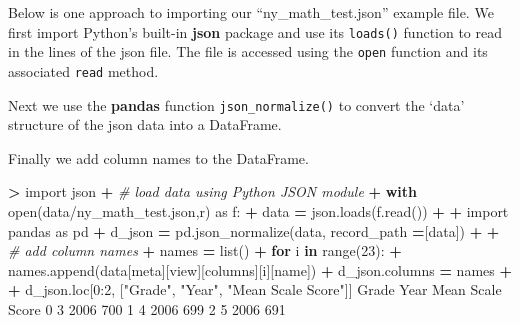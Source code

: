 \documentclass[
]{book}
\newenvironment{Shaded}{\begin{snugshade}}{\end{snugshade}}
\newcommand{\BuiltInTok}[1]{#1}
\newcommand{\CommentTok}[1]{\textcolor[rgb]{0.56,0.35,0.01}{\textit{#1}}}
\newcommand{\ControlFlowTok}[1]{\textcolor[rgb]{0.13,0.29,0.53}{\textbf{#1}}}
\newcommand{\DecValTok}[1]{\textcolor[rgb]{0.00,0.00,0.81}{#1}}
\newcommand{\ImportTok}[1]{#1}
\newcommand{\KeywordTok}[1]{\textcolor[rgb]{0.13,0.29,0.53}{\textbf{#1}}}
\newcommand{\NormalTok}[1]{#1}
\newcommand{\OperatorTok}[1]{\textcolor[rgb]{0.81,0.36,0.00}{\textbf{#1}}}
\newcommand{\StringTok}[1]{\textcolor[rgb]{0.31,0.60,0.02}{#1}}
\begin{document}
Below is one approach to importing our ``ny\_math\_test.json'' example file. We first import Python's built-in \textbf{json} package and use its \texttt{loads()} function to read in the lines of the json file. The file is accessed using the \texttt{open} function and its associated \texttt{read} method.

Next we use the \textbf{pandas} function \texttt{json\_normalize()} to convert the `data' structure of the json data into a DataFrame.

Finally we add column names to the DataFrame.

\begin{Shaded}
\begin{Highlighting}[]
\OperatorTok{\textgreater{}} \ImportTok{import}\NormalTok{ json}
\OperatorTok{+} \CommentTok{\# load data using Python JSON module}
\OperatorTok{+} \ControlFlowTok{with} \BuiltInTok{open}\NormalTok{(}\StringTok{\textquotesingle{}data/ny\_math\_test.json\textquotesingle{}}\NormalTok{,}\StringTok{\textquotesingle{}r\textquotesingle{}}\NormalTok{) }\ImportTok{as}\NormalTok{ f:}
\OperatorTok{+}\NormalTok{     data }\OperatorTok{=}\NormalTok{ json.loads(f.read())}
\OperatorTok{+} 
\OperatorTok{+} \ImportTok{import}\NormalTok{ pandas }\ImportTok{as}\NormalTok{ pd  }
\OperatorTok{+}\NormalTok{ d\_json }\OperatorTok{=}\NormalTok{ pd.json\_normalize(data, record\_path }\OperatorTok{=}\NormalTok{[}\StringTok{\textquotesingle{}data\textquotesingle{}}\NormalTok{])}
\OperatorTok{+} 
\OperatorTok{+} \CommentTok{\# add column names}
\OperatorTok{+}\NormalTok{ names }\OperatorTok{=} \BuiltInTok{list}\NormalTok{()}
\OperatorTok{+} \ControlFlowTok{for}\NormalTok{ i }\KeywordTok{in} \BuiltInTok{range}\NormalTok{(}\DecValTok{23}\NormalTok{): }
\OperatorTok{+}\NormalTok{   names.append(data[}\StringTok{\textquotesingle{}meta\textquotesingle{}}\NormalTok{][}\StringTok{\textquotesingle{}view\textquotesingle{}}\NormalTok{][}\StringTok{\textquotesingle{}columns\textquotesingle{}}\NormalTok{][i][}\StringTok{\textquotesingle{}name\textquotesingle{}}\NormalTok{])}
\OperatorTok{+}\NormalTok{ d\_json.columns }\OperatorTok{=}\NormalTok{ names}
\OperatorTok{+} 
\OperatorTok{+}\NormalTok{ d\_json.loc[}\DecValTok{0}\NormalTok{:}\DecValTok{2}\NormalTok{, [}\StringTok{"Grade"}\NormalTok{, }\StringTok{"Year"}\NormalTok{, }\StringTok{"Mean Scale Score"}\NormalTok{]]  }
\NormalTok{  Grade  Year Mean Scale Score}
\DecValTok{0}     \DecValTok{3}  \DecValTok{2006}              \DecValTok{700}
\DecValTok{1}     \DecValTok{4}  \DecValTok{2006}              \DecValTok{699}
\DecValTok{2}     \DecValTok{5}  \DecValTok{2006}              \DecValTok{691}
\end{Highlighting}
\end{Shaded}
\end{document}
